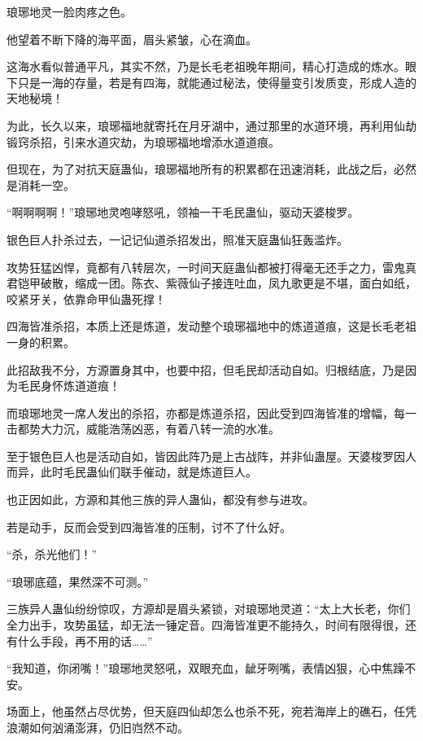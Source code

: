 
\begin{this_body}



琅琊地灵一脸肉疼之色。

他望着不断下降的海平面，眉头紧皱，心在滴血。

这海水看似普通平凡，其实不然，乃是长毛老祖晚年期间，精心打造成的炼水。眼下只是一海的存量，若是有四海，就能通过秘法，使得量变引发质变，形成人造的天地秘境！

为此，长久以来，琅琊福地就寄托在月牙湖中，通过那里的水道环境，再利用仙劫锻窍杀招，引来水道灾劫，为琅琊福地增添水道道痕。

但现在，为了对抗天庭蛊仙，琅琊福地所有的积累都在迅速消耗，此战之后，必然是消耗一空。

“啊啊啊啊！”琅琊地灵咆哮怒吼，领袖一干毛民蛊仙，驱动天婆梭罗。

银色巨人扑杀过去，一记记仙道杀招发出，照准天庭蛊仙狂轰滥炸。

攻势狂猛凶悍，竟都有八转层次，一时间天庭蛊仙都被打得毫无还手之力，雷鬼真君铠甲破散，缩成一团。陈衣、紫薇仙子接连吐血，凤九歌更是不堪，面白如纸，咬紧牙关，依靠命甲仙蛊死撑！

四海皆准杀招，本质上还是炼道，发动整个琅琊福地中的炼道道痕，这是长毛老祖一身的积累。

此招敌我不分，方源置身其中，也要中招，但毛民却活动自如。归根结底，乃是因为毛民身怀炼道道痕！

而琅琊地灵一席人发出的杀招，亦都是炼道杀招，因此受到四海皆准的增幅，每一击都势大力沉，威能浩荡凶恶，有着八转一流的水准。

至于银色巨人也是活动自如，皆因此阵乃是上古战阵，并非仙蛊屋。天婆梭罗因人而异，此时毛民蛊仙们联手催动，就是炼道巨人。

也正因如此，方源和其他三族的异人蛊仙，都没有参与进攻。

若是动手，反而会受到四海皆准的压制，讨不了什么好。

“杀，杀光他们！”

“琅琊底蕴，果然深不可测。”

三族异人蛊仙纷纷惊叹，方源却是眉头紧锁，对琅琊地灵道：“太上大长老，你们全力出手，攻势虽猛，却无法一锤定音。四海皆准更不能持久，时间有限得很，还有什么手段，再不用的话……”

“我知道，你闭嘴！”琅琊地灵怒吼，双眼充血，龇牙咧嘴，表情凶狠，心中焦躁不安。

场面上，他虽然占尽优势，但天庭四仙却怎么也杀不死，宛若海岸上的礁石，任凭浪潮如何汹涌澎湃，仍旧岿然不动。


\end{this_body}
